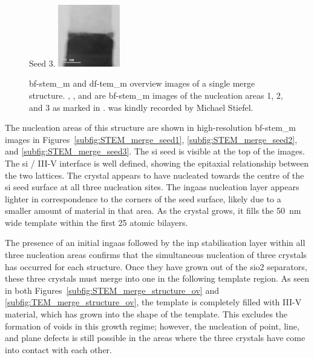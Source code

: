 \begin{figure}
{        Seed 3.
        \label{subfig:STEM_merge_seed3}
    }{
        \includegraphics[width=0.24\textwidth]{4_Properties/Fig/STEM_merge_seed3.pdf}
    }
    \caption{ \acs{bf}-\acs{stem_m} and  \acs{df}-\acs{tem_m} overview images of a single merge structure. , , and  are \acs{bf}-\acs{stem_m} images of the nucleation areas 1, 2, and 3 as marked in .  was kindly recorded by Michael Stiefel.}
    \label{fig:merge_ov_seeds}
\end{figure}

The nucleation areas of this structure are shown in high-resolution \acs{bf}-\acs{stem_m} images in Figures~\ref{subfig:STEM_merge_seed1}, \ref{subfig:STEM_merge_seed2}, and \ref{subfig:STEM_merge_seed3}. The \acl{si} seed is visible at the top of the images. The \acs{si} / III-V interface is well defined, showing the epitaxial relationship between the two lattices. The crystal appears to have nucleated towards the centre of the \acs{si} seed surface at all three nucleation sites. The \acs{ingaas} nucleation layer appears lighter in correspondence to the corners of the seed surface, likely due to a smaller amount of material in that area. As the crystal grows, it fills the \qty{50}{\nano\metre} wide template within the first 25 atomic bilayers.

The presence of an initial \acs{ingaas} followed by the \acs{inp} stabilisation layer within all three nucleation areas confirms that the simultaneous nucleation of three crystals has occurred for each structure. Once they have grown out of the \acs{sio2} separators, these three crystals must merge into one in the following template region. As seen in both Figures~\ref{subfig:STEM_merge_structure_ov} and \ref{subfig:TEM_merge_structure_ov}, the template is completely filled with III-V material, which has grown into the shape of the template. This excludes the formation of voids in this growth regime; however, the nucleation of point, line, and plane defects is still possible in the areas where the three crystals have come into contact with each other. 

